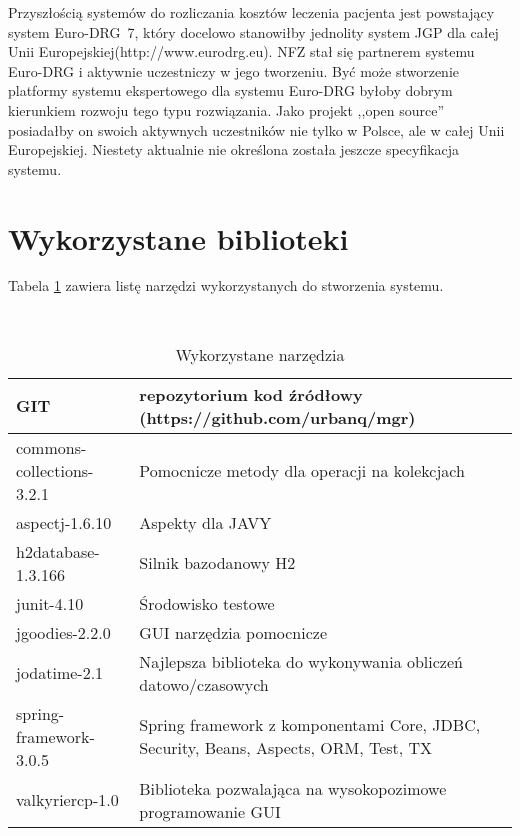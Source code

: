 Przyszłością systemów do rozliczania kosztów leczenia pacjenta jest powstający system \mbox{Euro-DRG~7}, który docelowo stanowiłby jednolity system JGP dla całej Unii Europejskiej(http://www.eurodrg.eu).
NFZ stał się partnerem systemu Euro-DRG i aktywnie uczestniczy w jego tworzeniu. Być może stworzenie platformy systemu ekspertowego dla systemu Euro-DRG byłoby dobrym kierunkiem rozwoju tego typu rozwiązania. Jako projekt ,,open source'' posiadałby on swoich aktywnych uczestników nie tylko w Polsce, ale w całej Unii Europejskiej. Niestety aktualnie nie określona została jeszcze specyfikacja systemu. 
\begin{comment}
Problematyczne jest podejście wszystkich firm startujących w przetargach, ponieważ każda z nich chce mieć monopol na cały obszar zastosowania systemu. Jest to w mojej opinii poważna przeszkoda w tworzeniu najlepszej jakości oprogramowania, ponieważ w jej wyniku powstają systemy skomplikowane, ktorych używa się tylko dlatego, że nie ma innej alternatywy. Podobnie jak system operacyjny Linux jest ciągle ,,konkurencją'' dla systemu Winodws, tak samo oprogramowanie openSource w każdej dziedzinie będzie uczestniczyć w nieustającym wyścigu z oprogramowaniem komercyjnym. 
\end{comment}

\section{Wykorzystane biblioteki}
\label{sec:wykorzystaneBiblioteki}
Tabela \ref{tab:tools} zawiera listę narzędzi wykorzystanych do stworzenia systemu.
\begin{table}[h]
 \caption{Wykorzystane narzędzia}
 \small\tt
 \centering
 \vspace{0in}
 \begin{tabular}{|l|p{7cm}|}
 \hline
 GIT & repozytorium kod źródłowy (https://github.com/urbanq/mgr) \\
 \hline
 commons-collections-3.2.1 & Pomocnicze metody dla operacji na kolekcjach \\
 \hline
 aspectj-1.6.10 & Aspekty dla JAVY \\
 \hline
 h2database-1.3.166 & Silnik bazodanowy H2 \\
 \hline
 junit-4.10 & Środowisko testowe \\
 \hline
 jgoodies-2.2.0 & GUI narzędzia pomocnicze \\
 \hline
 jodatime-2.1 & Najlepsza biblioteka do wykonywania obliczeń datowo/czasowych \\
 \hline
 spring-framework-3.0.5 & Spring framework z komponentami Core, JDBC, Security, Beans, Aspects, ORM, Test, TX \\
 \hline
 valkyriercp-1.0 & Biblioteka pozwalająca na wysokopozimowe programowanie GUI \\
 \hline
 \end{tabular}
 \label{tab:tools}
\end{table}

